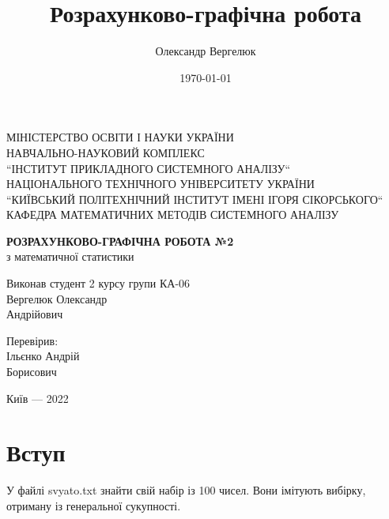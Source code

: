 \documentclass[14pt, a4paper, ukrainian]{extreport}
\title{Розрахунково-графічна робота}
\author{Олександр Вергелюк}
\date{\today}
\begin{document}
	\begin{titlepage}
		\centering
		\vspace{1cm}
		{ МІНІСТЕРСТВО ОСВІТИ І НАУКИ УКРАЇНИ\\
			НАВЧАЛЬНО-НАУКОВИЙ КОМПЛЕКС\\
			``ІНСТИТУТ ПРИКЛАДНОГО СИСТЕМНОГО АНАЛІЗУ``\\
			НАЦІОНАЛЬНОГО ТЕХНІЧНОГО УНІВЕРСИТЕТУ УКРАЇНИ\\
			``КИЇВСЬКИЙ ПОЛІТЕХНІЧНИЙ ІНСТИТУТ ІМЕНІ ІГОРЯ СІКОРСЬКОГО``\\
			КАФЕДРА МАТЕМАТИЧНИХ МЕТОДІВ  СИСТЕМНОГО АНАЛІЗУ\\\par}
		\vspace{5cm}
		\MakeUppercase {\textsc{\textbf{{розрахунково-графічна робота №2}}}}\\
		{з математичної статистики} \\
		\vfill
		\newlength{\ML}
		\settowidth{\ML}{\hspace{3.4cm}}
		\hfill
		\begin{minipage}{0.35\textwidth}
			Виконав студент 2 курсу групи КА-06\\
			Вергелюк Олександр\\ Андрійович
			
			Перевірив: \\
			Ільєнко Андрій\\ Борисович
		\end{minipage}
		\vfill
		\begin{center}
			Київ --- 2022
		\end{center}
	\end{titlepage}
	\setcounter{page}{2}
	\renewcommand\contentsname{Зміст}
	\tableofcontents
	\chapter*{Вступ}
	У файлі svyato.txt знайти свій набір із 100 чисел. Вони імітують вибірку, отриману із генеральної сукупності.
	
\end{document}
